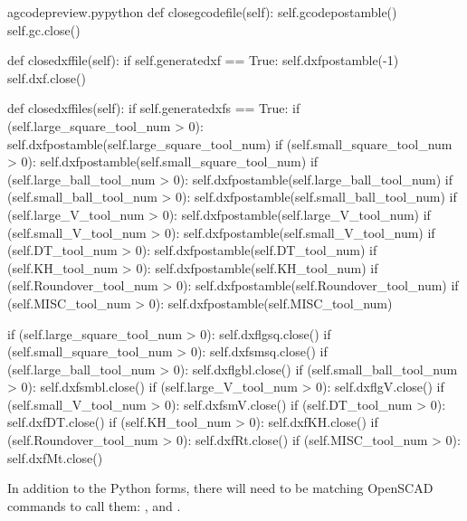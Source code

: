 \documentclass{ltxdoc}
\begin{document}
\lstset{firstnumber=\thegcpy}
\begin{writecode}{a}{gcodepreview.py}{python}
    def closegcodefile(self):
        self.gcodepostamble()
        self.gc.close()

    def closedxffile(self):
        if self.generatedxf == True:
            self.dxfpostamble(-1)
            self.dxf.close()
    
    def closedxffiles(self):
        if self.generatedxfs == True:
            if (self.large_square_tool_num > 0):
                self.dxfpostamble(self.large_square_tool_num)
            if (self.small_square_tool_num > 0):
                self.dxfpostamble(self.small_square_tool_num)
            if (self.large_ball_tool_num > 0):
                self.dxfpostamble(self.large_ball_tool_num)
            if (self.small_ball_tool_num > 0):
                self.dxfpostamble(self.small_ball_tool_num)
            if (self.large_V_tool_num > 0):
                self.dxfpostamble(self.large_V_tool_num)
            if (self.small_V_tool_num > 0):
                self.dxfpostamble(self.small_V_tool_num)
            if (self.DT_tool_num > 0):
                self.dxfpostamble(self.DT_tool_num)
            if (self.KH_tool_num > 0):
                self.dxfpostamble(self.KH_tool_num)
            if (self.Roundover_tool_num > 0):
                self.dxfpostamble(self.Roundover_tool_num)
            if (self.MISC_tool_num > 0):
                self.dxfpostamble(self.MISC_tool_num)
                
            if (self.large_square_tool_num > 0):
                self.dxflgsq.close()
            if (self.small_square_tool_num > 0):
                self.dxfsmsq.close()
            if (self.large_ball_tool_num > 0):
                self.dxflgbl.close()
            if (self.small_ball_tool_num > 0):
                self.dxfsmbl.close()
            if (self.large_V_tool_num > 0):
                self.dxflgV.close()
            if (self.small_V_tool_num > 0):
                self.dxfsmV.close()
            if (self.DT_tool_num > 0):
                self.dxfDT.close()
            if (self.KH_tool_num > 0):
                self.dxfKH.close()
            if (self.Roundover_tool_num > 0):
                self.dxfRt.close()
            if (self.MISC_tool_num > 0):
                self.dxfMt.close()

\end{writecode}
\addtocounter{gcpy}{53}
%

In addition to the Python forms, there will need to be matching OpenSCAD commands to call them:
, and 
.
\end{document}

